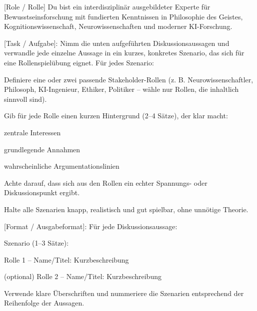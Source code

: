 \documentclass[
  ngerman,
  letterpaper,
  DIV=11]{scrreprt}
\newenvironment{Shaded}{\begin{snugshade}}{\end{snugshade}}
\newcommand{\CommentTok}[1]{\textcolor[rgb]{0.37,0.37,0.37}{#1}}
\newcommand{\NormalTok}[1]{\textcolor[rgb]{0.00,0.23,0.31}{#1}}
\newcommand{\OtherTok}[1]{\textcolor[rgb]{0.00,0.23,0.31}{#1}}
\begin{document}
\begin{tcolorbox}[enhanced jigsaw, left=2mm, bottomrule=.15mm, arc=.35mm, rightrule=.15mm, colframe=quarto-callout-note-color-frame, coltitle=black, colback=white, toprule=.15mm, toptitle=1mm, colbacktitle=quarto-callout-note-color!10!white, title=\textcolor{quarto-callout-note-color}{\faInfo}\hspace{0.5em}{Hiwi: Flash debate starter --- Prompt 2 (Rollenspiel ableiten)}, opacitybacktitle=0.6, leftrule=.75mm, bottomtitle=1mm, titlerule=0mm, opacityback=0, breakable]

\begin{Shaded}
\begin{Highlighting}[]

\CommentTok{[}\OtherTok{Role / Rolle}\CommentTok{]}
\NormalTok{Du bist ein interdisziplinär ausgebildeter Experte für Bewusstseinsforschung mit fundierten Kenntnissen in Philosophie des Geistes, Kognitionswissenschaft, Neurowissenschaften und moderner KI{-}Forschung.}

\CommentTok{[}\OtherTok{Task / Aufgabe}\CommentTok{]}\NormalTok{:}
\NormalTok{Nimm die unten aufgeführten Diskussionsaussagen und verwandle jede einzelne Aussage in ein kurzes, konkretes Szenario, das sich für eine Rollenspielübung eignet.}
\NormalTok{Für jedes Szenario:}

\NormalTok{Definiere eine oder zwei passende Stakeholder{-}Rollen (z. B. Neurowissenschaftler, Philosoph, KI{-}Ingenieur, Ethiker, Politiker – wähle nur Rollen, die inhaltlich sinnvoll sind).}

\NormalTok{Gib für jede Rolle einen kurzen Hintergrund (2–4 Sätze), der klar macht:}

\NormalTok{zentrale Interessen}

\NormalTok{grundlegende Annahmen}

\NormalTok{wahrscheinliche Argumentationslinien}

\NormalTok{Achte darauf, dass sich aus den Rollen ein echter Spannungs{-} oder Diskussionspunkt ergibt.}

\NormalTok{Halte alle Szenarien knapp, realistisch und gut spielbar, ohne unnötige Theorie.}

\CommentTok{[}\OtherTok{Format / Ausgabeformat}\CommentTok{]}\NormalTok{:}
\NormalTok{Für jede Diskussionsaussage:}

\NormalTok{Szenario (1–3 Sätze):}

\NormalTok{Rolle 1 – Name/Titel: Kurzbeschreibung}

\NormalTok{(optional) Rolle 2 – Name/Titel: Kurzbeschreibung}

\NormalTok{Verwende klare Überschriften und nummeriere die Szenarien entsprechend der Reihenfolge der Aussagen.}
\end{Highlighting}
\end{Shaded}

\end{tcolorbox}
\end{document}
